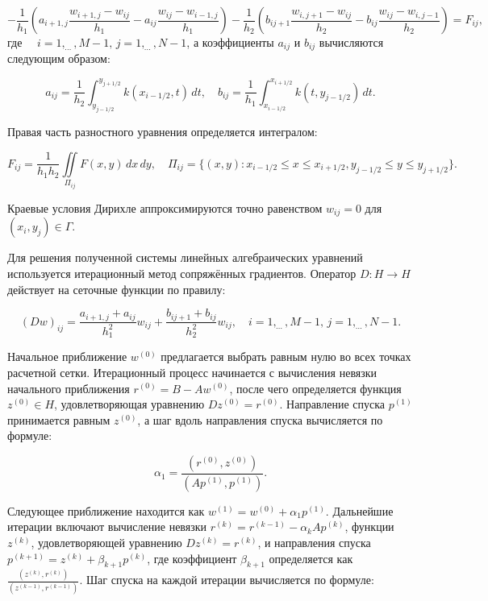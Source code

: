 \documentclass[12pt,a4paper]{article}
\begin{document}
    $$
    -\frac{1}{h_1}\left(a_{i+1,j}\frac{w_{i+1,j} - w_{ij}}{h_1} - a_{ij}\frac{w_{ij} - w_{i-1,j}}{h_1}\right) - \frac{1}{h_2}\left(b_{ij+1} \frac{w_{i,j+1} - w_{ij}}{h_2} - b_{ij}\frac{w_{ij} - w_{i,j-1}}{h_2}\right) = F_{ij},
    $$
    где $ \quad i = 1, _{\cdots},  M - 1, \, j = 1, _{\cdots}, N - 1$, а коэффициенты $a_{ij}$ и $b_{ij}$ вычисляются следующим образом:
    
    $$
    a_{ij} = \frac{1}{h_2} \int_{y_{j-1/2}}^{y_{j+1/2}} k(x_{i-1/2}, t) \, dt, \quad b_{ij} = \frac{1}{h_1} \int_{x_{i-1/2}}^{x_{i+1/2}} k(t, y_{j-1/2}) \, dt.
    $$
    
    Правая часть разностного уравнения определяется интегралом:
    
    $$
    F_{ij} = \frac{1}{h_1h_2} \iint\limits_{\Pi_{ij}} F(x, y) \, dx \, dy, \quad \Pi_{ij} = \{(x, y): x_{i-1/2} \leq x \leq x_{i+1/2}, y_{j-1/2} \leq y \leq y_{j+1/2}\}.
    $$
    
    Краевые условия Дирихле аппроксимируются точно равенством $w_{ij} = 0$ для $(x_i, y_j) \in \Gamma$.
    
    Для решения полученной системы линейных алгебраических уравнений используется итерационный метод сопряжённых градиентов. Оператор $D: H \to H$ действует на сеточные функции по правилу:
    
    $$
    (Dw)_{ij} = \frac{a_{i+1,j} + a_{ij}}{h_1^2} w_{ij} + \frac{b_{ij+1} + b_{ij}}{h_2^2} w_{ij}, \quad i = 1, _{\cdots}, M - 1, \, j = 1, _{\cdots}, N - 1.
    $$
    
    Начальное приближение $w^{(0)}$ предлагается выбрать равным нулю во всех точках расчетной сетки. Итерационный процесс начинается с вычисления невязки начального приближения $r^{(0)} = B - Aw^{(0)}$, после чего определяется функция $z^{(0)} \in H$, удовлетворяющая уравнению $Dz^{(0)} = r^{(0)}$. Направление спуска $p^{(1)}$ принимается равным $z^{(0)}$, а шаг вдоль направления спуска вычисляется по формуле:
    
    $$
    \alpha_1 = \frac{(r^{(0)}, z^{(0)})}{(Ap^{(1)}, p^{(1)})}.
    $$
    
    Следующее приближение находится как $w^{(1)} = w^{(0)} + \alpha_1 p^{(1)}$. Дальнейшие итерации включают вычисление невязки $r^{(k)} = r^{(k-1)} - \alpha_k Ap^{(k)}$, функции $z^{(k)}$, удовлетворяющей уравнению $Dz^{(k)} = r^{(k)}$, и направления спуска $p^{(k+1)} = z^{(k)} + \beta_{k+1} p^{(k)}$, где коэффициент $\beta_{k+1}$ определяется как $\frac{(z^{(k)}, r^{(k)})}{(z^{(k-1)}, r^{(k-1)})}$. Шаг спуска на каждой итерации вычисляется по формуле:
    
\end{document}
